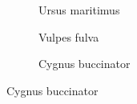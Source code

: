 \documentclass[times, utf8, diplomski]{fer}
\begin{document}
\begin{figure}
        \begin{subfigure}[b]{0.32\textwidth}
        \centering
        \caption{Ursus maritimus}
        \label{fig:ursus_maritimus}
    \end{subfigure}
        \begin{subfigure}[b]{0.32\textwidth}
        \centering
        \caption{Vulpes fulva}
        \label{fig:vulpes_fulva}
    \end{subfigure}
        \begin{subfigure}[b]{0.32\textwidth}
        \centering
        \caption{Cygnus buccinator}
        \label{fig:cygnus_buccinator}
    \end{subfigure}
    

\end{figure}
\end{document}
